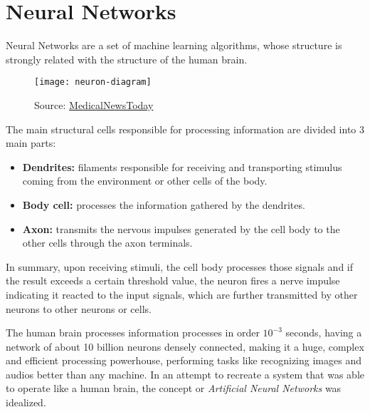 \section{Neural Networks}
Neural Networks are a set of machine learning algorithms, whose structure is strongly related with the structure of the human brain. 
\begin{figure}[H]
    \texttt{[image: neuron-diagram]}
    \caption{Source: \href{https://www.medicalnewstoday.com/articles/320289}{MedicalNewsToday}}
\end{figure}
The main structural cells responsible for processing information are divided into 3 main parts:
\begin{itemize}
    \item \textbf{Dendrites:} filaments responsible for receiving and transporting stimulus coming from the environment or other cells of the body.
    \item \textbf{Body cell:} processes the information gathered by the dendrites.
    \item \textbf{Axon:} transmits the nervous impulses generated by the cell body to the other cells through the axon terminals.
\end{itemize}
In summary, upon receiving stimuli, the cell body processes those signals and if the result exceeds a certain threshold value, the neuron fires a nerve impulse indicating it reacted to the input signals, which are further transmitted by other neurons to other neurons or cells.

The human brain processes information processes in order $10^{-3}$ seconds, having a network of about 10 billion neurons densely connected, making it a huge, complex and efficient processing powerhouse, performing tasks like recognizing images and audios better than any machine. In an attempt to recreate a system that was able to operate like a human brain, the concept or \textit{Artificial Neural Networks} was idealized.

